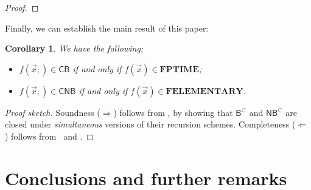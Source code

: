 \documentclass[manuscript,screen]{acmart}
\newtheorem{cor}[thm]{Corollary}
\theoremstyle{definition}
\theoremstyle{remark}
\newcommand{\permpref}{\subset}
\newcommand{\ptime}{\mathbf{PTIME}}
\newcommand{\elementary}{\mathbf{ELEMENTARY}}
\newcommand{\f}{\mathbf{F}}
\newcommand{\fptime}{\f\ptime}
\newcommand{\felementary}{\f\elementary}
\newcommand{\model}[1]{\denot{#1}}
\newcommand{\denot}[1]{f_{#1}}
\newcommand{\bc}{\mathsf{B}}
\newcommand{\bcwfpo}[1]{\bc^{#1}}
\newcommand{\nested}{\mathsf{N}}
\newcommand{\nbcwfpo}[1]{\nested\bcwfpo{#1}}
\newcommand{\bcpp}{\bcwfpo{\permpref}}
\newcommand{\nbcpp}{\nbcwfpo{\permpref}}
\newcommand{\der}{\mathcal{D}}
\newcommand{\pder}[1]{\der_{#1}}
\newcommand{\close}[1]{{C}_{#1}}
\newcommand{\open}[1]{{O}_{#1}}
\newcommand{\hnu}{\nu_0}
\newcommand{\cyclic}{\mathsf{C}}
\newcommand{\cbc}{\cyclic\bc}
\newcommand{\ncbc}{\cyclic\nested\bc}
\begin{document}
\begin{proof}



\end{proof}




Finally, we can establish the main result of this paper:
\begin{cor}\label{cor:main-theorem} 
We have the following:
\begin{itemize}
    \item $f(\vec x; )\in \cbc$ if and only if $f(\vec x)\in \fptime$;
    \item $f(\vec x; )\in \ncbc$ if and only if $f(\vec x)\in \felementary$.
\end{itemize}
\end{cor}
\begin{proof}
[Proof sketch]
Soundness ($\Rightarrow$) follows from , by showing that $\bcpp$ and $\nbcpp$ are closed under \emph{simultaneous} versions of their recursion schemes.
Completeness ($\Leftarrow$) follows  from~ and . 
\end{proof}
\section{Conclusions and further remarks}\label{sec:conclusion}
\end{document}
